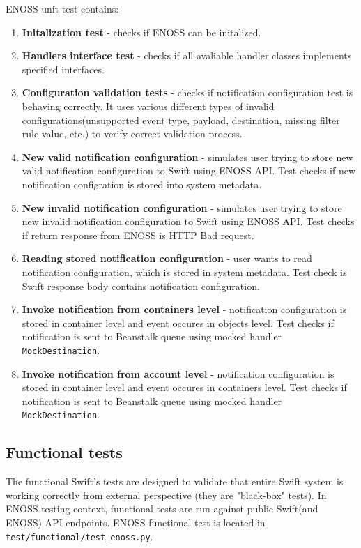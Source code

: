     ENOSS unit test contains:
    \begin{enumerate}
        \item \textbf{Initalization test} - checks if ENOSS can be initalized.
        \item \textbf{Handlers interface test} - checks if all avaliable handler classes implements specified interfaces.
        \item \textbf{Configuration validation tests} - checks if notification configuration test is behaving correctly. It uses various different types of invalid configurations(unsupported event type, payload, destination, missing filter rule value, etc.) to verify correct validation process.
        \item \textbf{New valid notification configuration} - simulates user trying to store new valid notification configuration to Swift using ENOSS API. Test checks if new notification configration is stored into system metadata.
        \item \textbf{New invalid notification configuration} - simulates user trying to store new invalid notification configuration to Swift using ENOSS API. Test checks if return response from ENOSS is HTTP Bad request.
        \item \textbf{Reading stored notification configuration} - user wants to read notification configuration, which is stored in system metadata. Test check is Swift response body contains notification configuration.
        \item \textbf{Invoke notification from containers level} - notification configuration is stored in container level and event occures in objects level. Test checks if notification is sent to Beanstalk queue using mocked handler \texttt{MockDestination}.
        \item \textbf{Invoke notification from account level} - notification configuration is stored in container level and event occures in containers level. Test checks if notification is sent to Beanstalk queue using mocked handler \texttt{MockDestination}.
    \end{enumerate}

    \subsection{Functional tests}
    The functional Swift's tests are designed to validate that entire Swift system is working correctly from external perspective (they are "black-box" tests). In ENOSS testing context, functional tests are run against public Swift(and ENOSS) API endpoints. ENOSS functional test is located in \texttt{test/functional/test\_enoss.py}.

